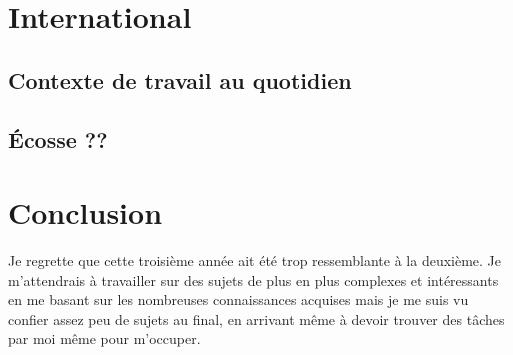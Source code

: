 \documentclass[a4paper,12pt]{report}
\begin{document}
\chapter{International}
\section{Contexte de travail au quotidien}
\section{Écosse ??}

\chapter{Conclusion}

Je regrette que cette troisième année ait été trop ressemblante à la deuxième. Je m'attendrais à travailler sur des sujets de plus en plus complexes et intéressants en me basant sur les nombreuses connaissances acquises mais je me suis vu confier assez peu de sujets au final, en arrivant même à devoir trouver des tâches par moi même pour m'occuper.
\end{document}
